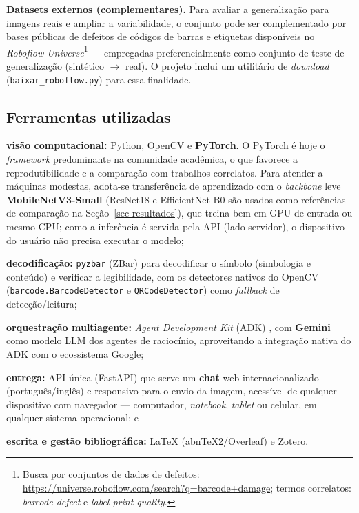 \documentclass[
	article,			%
	11pt,				%
	oneside,			%
	a4paper,			%
	english,			%
	brazilian,			%
	sumario=tradicional
	]{abntex2}
\begin{document}
\noindent\textbf{Datasets externos (complementares).} Para avaliar a generalização
para imagens reais e ampliar a variabilidade, o conjunto pode ser complementado por
bases públicas de defeitos de códigos de barras e etiquetas disponíveis no
\textit{Roboflow Universe}\footnote{Busca por conjuntos de dados de defeitos:
\url{https://universe.roboflow.com/search?q=barcode+damage}; termos correlatos:
\textit{barcode defect} e \textit{label print quality}.} --- empregadas
preferencialmente como conjunto de teste de generalização (sintético $\rightarrow$
real). O projeto inclui um utilitário de \textit{download}
(\texttt{baixar\_roboflow.py}) para essa finalidade.

\subsection{Ferramentas utilizadas}

\begin{alineas}
	\item \textbf{visão computacional:} Python, OpenCV e \textbf{PyTorch}. O
	PyTorch é hoje o \textit{framework} predominante na comunidade acadêmica, o
	que favorece a reprodutibilidade e a comparação com trabalhos correlatos. Para
	atender a máquinas modestas, adota-se transferência de aprendizado com o
	\textit{backbone} leve \textbf{MobileNetV3-Small} (ResNet18 e EfficientNet-B0 são
	usados como referências de comparação na Seção~\ref{sec-resultados}),
	que treina bem em GPU de entrada ou mesmo CPU; como a inferência é servida pela
	API (lado servidor), o dispositivo do usuário não precisa executar o modelo;
	\item \textbf{decodificação:} \texttt{pyzbar} (ZBar) para decodificar o
	símbolo (simbologia e conteúdo) e verificar a legibilidade, com os detectores
	nativos do OpenCV (\texttt{barcode.BarcodeDetector} e \texttt{QRCodeDetector})
	como \textit{fallback} de detecção/leitura;
	\item \textbf{orquestração multiagente:} \textit{Agent Development Kit} (ADK)
	\cite{google_adk_blog}, com \textbf{Gemini} como modelo LLM dos agentes de
	raciocínio, aproveitando a integração nativa do ADK com o ecossistema Google;
	\item \textbf{entrega:} API única (FastAPI) que serve um \textbf{chat} web
	internacionalizado (português/inglês) e responsivo para o envio da imagem,
	acessível de qualquer dispositivo com navegador --- computador,
	\textit{notebook}, \textit{tablet} ou celular, em qualquer sistema operacional;
	e
	\item \textbf{escrita e gestão bibliográfica:} \LaTeX{} (abnTeX2/Overleaf) e
	Zotero.
\end{alineas}
\end{document}
